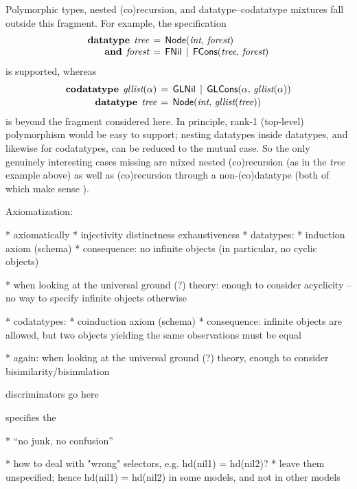 \documentclass[a4paper,oribibl,envcountsame,draft]{llncs}
\newcommand\keyw[1]{\textbf{#1}}
\newcommand\const[1]{\textsf{#1}}
\newcommand\ty[1]{\textit{#1}}
\begin{document}
Polymorphic types, nested (co)recursion, and datatype--codatatype mixtures fall
outside this fragment. For example, the specification
\[\begin{aligned}[t]
      \keyw{datatype}\;\, \ty{tree} & \,=\, \const{Node}(\ty{int},\, \ty{forest}) \\[-\jot]
      \keyw{and}\;\, \ty{forest} & \,=\, \const{FNil} \,\mid\, \const{FCons}(\ty{tree},\, \ty{forest})
\end{aligned}
\]
is supported, whereas
\[\begin{aligned}[t]
      \keyw{codatatype}\; \,\ty{gllist}(\alpha) & \,=\, \const{GLNil} \,\mid\, \const{GLCons}(\alpha,\, \ty{gllist}(\alpha)) \\[-.5\jot]
      \keyw{datatype}\;\, \ty{tree} & \,=\, \const{Node}(\ty{int},\, \ty{gllist}(\ty{tree}))
\end{aligned}
\]
is beyond the fragment considered here. In principle, rank-1 (top-level)
polymorphism would be easy to support; nesting datatypes inside datatypes,
and likewise for codatatypes, can be reduced to the mutual case. So the only
genuinely interesting cases missing are mixed nested (co)recursion
(as in the \ty{tree} example above) as well as (co)recursion through a
non-(co)datatype (both of which make sense \cite{blanchette-et-al-2014-codata}).

Axiomatization:

  * axiomatically
    * injectivity
      distinctness
      exhaustiveness
    * datatypes:
      * induction axiom (schema)
        * consequence: no infinite objects (in particular, no cyclic objects)

      * when looking at the universal ground (?) theory:
        enough to consider acyclicity -- no way to specify infinite objects
        otherwise

    * codatatypes:
      * coinduction axiom (schema)
        * consequence: infinite objects are allowed, but
          two objects yielding the same observations must be equal

      * again: when looking at the universal ground (?) theory, enough to
        consider bisimilarity/bisimulation

discriminators go here


specifies the 

    * ``no junk, no confusion''


  * how to deal with "wrong" selectors, e.g.
        hd(nil1) = hd(nil2)?
      * leave them unspecified; hence hd(nil1) = hd(nil2) in some models,
        and not in other models
\end{document}
